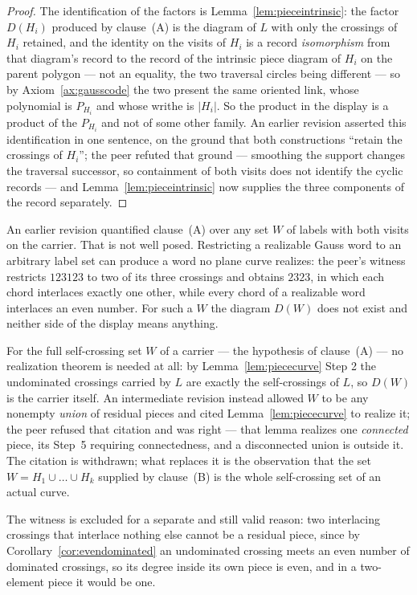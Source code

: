 \begin{proof}
The identification of the factors is Lemma~\ref{lem:pieceintrinsic}: the factor
$D(H_i)$ produced by clause~(A) is the diagram of $L$ with
only the crossings of $H_i$ retained, and the identity on the visits of $H_i$ is
a record \emph{isomorphism} from that diagram's record to the record of the
intrinsic piece diagram of $H_i$ on the parent polygon --- not an equality, the
two traversal circles being different --- so by Axiom~\ref{ax:gausscode} the two
present the same oriented link, whose polynomial is $P_{H_i}$ and whose writhe
is $|H_i|$. So the product in the display is a
product of the $P_{H_i}$ and not of some other family. An earlier revision
asserted this identification in one sentence, on the ground that both
constructions ``retain the crossings of $H_i$''; the peer refuted that ground
--- smoothing the support changes the traversal successor, so containment of
both visits does not identify the cyclic records --- and
Lemma~\ref{lem:pieceintrinsic} now supplies the three components of the record
separately.
\end{proof}

\begin{remark}
\label{rem:connectedsumscope}
An earlier revision quantified clause~(A) over any set $W$ of labels with both
visits on the carrier. That is not well posed. Restricting a realizable Gauss
word to an arbitrary label set can produce a word no plane curve realizes: the
peer's witness restricts $123123$ to two of its three crossings and obtains
$2323$, in which each chord interlaces exactly one other, while every chord of a
realizable word interlaces an even number. For such a $W$ the diagram $D(W)$
does not exist and neither side of the display means anything.

For the full self-crossing set $W$ of a carrier --- the hypothesis of clause~(A) ---
no realization theorem is needed at all: by Lemma~\ref{lem:piececurve} Step 2 the
undominated crossings carried by $L$ are exactly the self-crossings of $L$, so
$D(W)$ is the carrier itself. An intermediate revision instead allowed $W$ to be
any nonempty \emph{union} of residual pieces and cited
Lemma~\ref{lem:piececurve} to realize it; the peer refused that citation and was
right --- that lemma realizes one \emph{connected} piece, its Step~5 requiring
connectedness, and a disconnected union is outside it. The citation is
withdrawn; what replaces it is the observation that the set
$W=H_1\cup\dots\cup H_k$ supplied by clause~(B) is the whole self-crossing
set of an actual curve.

The witness is excluded for a separate and still valid reason: two interlacing
crossings that interlace nothing else cannot be a residual piece, since by
Corollary~\ref{cor:evendominated} an undominated crossing meets an even number
of dominated crossings, so its degree inside its own piece is even, and in a
two-element piece it would be one.
\end{remark}

